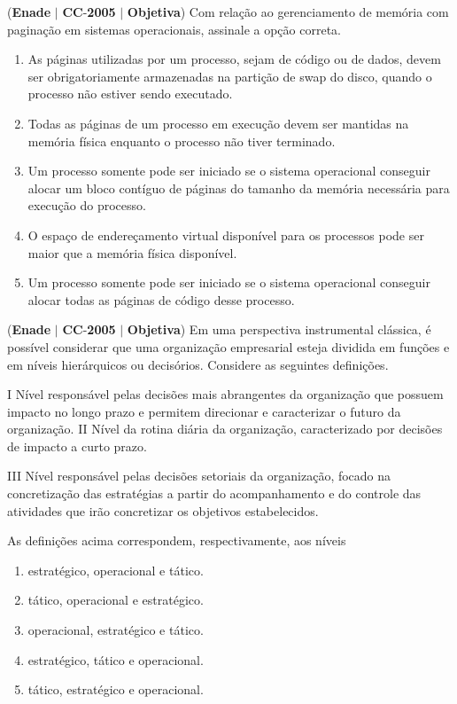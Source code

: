 \documentclass{exam}
\begin{document}
\begin{questions}
\question (\textbf{Enade} $|$ \textbf{CC}-\textbf{2005} $|$ \textbf{Objetiva})
Com relação ao gerenciamento de memória com paginação em
sistemas operacionais, assinale a opção correta.
	\begin{enumerate}[label=\alph*)]
		\item  As páginas utilizadas por um processo, sejam de código ou de
dados, devem ser obrigatoriamente armazenadas na partição de
swap do disco, quando o processo não estiver sendo executado.
		\item  Todas as páginas de um processo em execução devem ser
mantidas na memória física enquanto o processo não tiver
terminado.
		\item  Um processo somente pode ser iniciado se o sistema
operacional conseguir alocar um bloco contíguo de páginas do
tamanho da memória necessária para execução do processo.
		\item  O espaço de endereçamento virtual disponível para os processos
pode ser maior que a memória física disponível.
		\item  Um processo somente pode ser iniciado se o sistema
operacional conseguir alocar todas as páginas de código
desse processo.
	\end{enumerate}

\question (\textbf{Enade} $|$ \textbf{CC}-\textbf{2005} $|$ \textbf{Objetiva})
Em uma perspectiva instrumental clássica, é possível considerar
que uma organização empresarial esteja dividida em funções e em
níveis hierárquicos ou decisórios. Considere as seguintes
definições.

I Nível responsável pelas decisões mais abrangentes da
organização que possuem impacto no longo prazo e permitem
direcionar e caracterizar o futuro da organização.
II Nível da rotina diária da organização, caracterizado por
decisões de impacto a curto prazo.

III Nível responsável pelas decisões setoriais da organização,
focado na concretização das estratégias a partir do
acompanhamento e do controle das atividades que irão
concretizar os objetivos estabelecidos.

As definições acima correspondem, respectivamente, aos níveis
	\begin{enumerate}[label=\alph*)]
		\item  estratégico, operacional e tático.
		\item  tático, operacional e estratégico.
		\item  operacional, estratégico e tático.
		\item  estratégico, tático e operacional.
		\item  tático, estratégico e operacional.
	\end{enumerate}


\end{questions}
\end{document}
